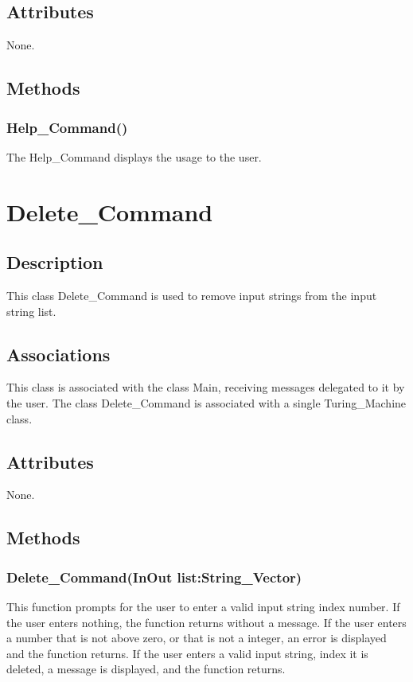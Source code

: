 \documentclass{report}
\begin{document}
    \subsection{Attributes}
    None.
    \subsection{Methods} 
    \subsubsection{Help\_Command()}
    The Help\_Command displays the usage to the user.
    
    
    
    
\section{Delete\_Command}
	\subsection{Description}
    This class Delete\_Command is used to remove input strings from the input string list.
    \subsection{Associations} 
    This class is associated with the class Main, receiving messages delegated to it by the user.
      The class Delete\_Command is associated with a single Turing\_Machine class.
    
    \subsection{Attributes} 
    None.
    \subsection{Methods}
    \subsubsection{Delete\_Command(InOut list:String\_Vector)}
    This function prompts for the user to enter a valid input string index number. If the user enters nothing, the function returns without a message. If the user enters a number that is not above zero, or that is not a integer, an error is displayed and the function returns. If the user enters a valid input string, index it is deleted, a message is displayed, and the function returns.
    
\end{document}
